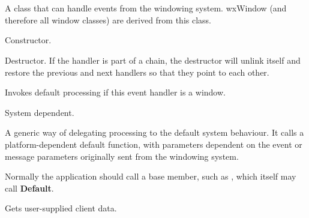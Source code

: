 \section{}\label{wxevthandler}

A class that can handle events from the windowing system.
wxWindow (and therefore all window classes) are derived from
this class.








Constructor.



Destructor. If the handler is part of a chain, the destructor will
unlink itself and restore the previous and next handlers so that they point to
each other.

\label{wxevthandlerdefault}


Invokes default processing if this event handler is a window.


System dependent.


A generic way of delegating processing to the default system behaviour. It calls a platform-dependent
default function, with parameters dependent on the event or message parameters
originally sent from the windowing system.

Normally the application should call a base member, such as , which itself
may call {\bf Default}.

\label{wxevthandlergetclientdata}


Gets user-supplied client data.


